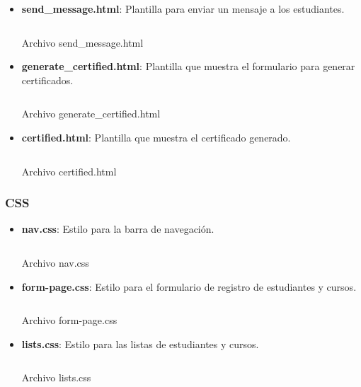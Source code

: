 \documentclass{article}
\newenvironment{block}{\captionsetup{type=listing}}{}
\begin{document}
\begin{itemize}
	\item \textbf{send\_message.html}: Plantilla para enviar un mensaje a los estudiantes.
	      \begin{block}
		      \inputminted{html}{../Course_Management_System/systemM/templates/send_message.html}
		      \caption{Archivo send\_message.html}
	      \end{block}

	\item \textbf{generate\_certified.html}: Plantilla que muestra el formulario para generar certificados.
	      \begin{block}
		      \inputminted{html}{../Course_Management_System/systemM/templates/generate_certified.html}
		      \caption{Archivo generate\_certified.html}
	      \end{block}
	\item \textbf{certified.html}: Plantilla que muestra el certificado generado.
	      \begin{block}
		      \inputminted{html}{../Course_Management_System/systemM/templates/certified.html}
		      \caption{Archivo certified.html}
	      \end{block}
\end{itemize}

\subsubsection{CSS}
\begin{itemize}
	\item \textbf{nav.css}: Estilo para la barra de navegación.
	      \begin{block}
		      \inputminted{CSS}{../Course_Management_System/systemM/templates/css/nav.css}
		      \caption{Archivo nav.css}
	      \end{block}

	\item \textbf{form-page.css}: Estilo para el formulario de registro de estudiantes y cursos.
	      \begin{block}
		      \inputminted{CSS}{../Course_Management_System/systemM/templates/css/form-page.css}
		      \caption{Archivo form-page.css}
	      \end{block}

	\item \textbf{lists.css}: Estilo para las listas de estudiantes y cursos.
	      \begin{block}
		      \inputminted{CSS}{../Course_Management_System/systemM/templates/css/lists.css}
		      \caption{Archivo lists.css}
	      \end{block}
\end{itemize}
\end{document}
